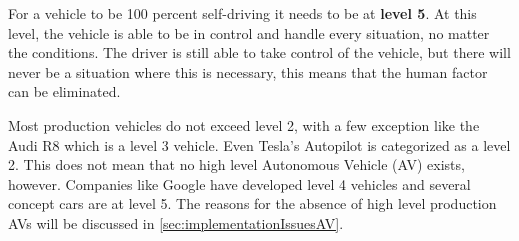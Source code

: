 For a vehicle to be 100 percent self-driving it needs to be at \textbf{level 5}.
At this level, the vehicle is able to be in control and handle every situation, no matter the conditions.
The driver is still able to take control of the vehicle, but there will never be a situation where this is necessary, this means that the human factor can be eliminated.

Most production vehicles do not exceed level 2, with a few exception like the Audi R8 which is a level 3 vehicle.
Even Tesla's Autopilot is categorized as a level 2.
This does not mean that no high level Autonomous Vehicle (AV) exists, however.
Companies like Google have developed level 4 vehicles and several concept cars are at level 5.
The reasons for the absence of high level production AVs will be discussed in \autoref{sec:implementationIssuesAV}.
\cite{6_levels_with_examples}
